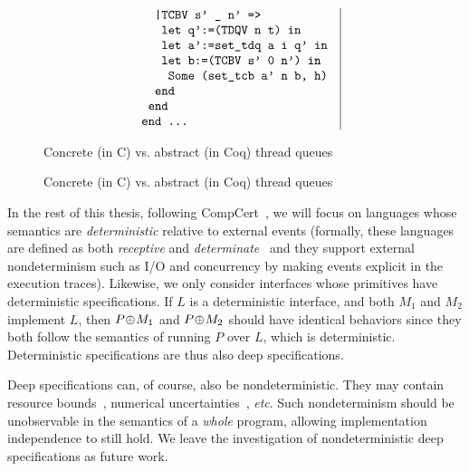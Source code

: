 \begin{figure}[t]
$$\begin{array}{l|l}
\begin{array}[t]{l}
\verb+  |TCBV s' _ n' =>+\\
\verb+   let q':=(TDQV n t) in+\\
\verb+   let a':=set_tdq a i q' in+\\
\verb+   let b:=(TCBV s' 0 n') in+\\
\verb+    Some (set_tcb a' n b, h)+\\
\verb+  end+\\
\verb+ end+\\
\verb+end ...+
\end{array}
\end{array}
$$ 
\caption{Concrete (in C) vs. abstract (in Coq) thread queues}
\label{fig:queue}
\end{figure}


\begin{figure}[tb]\centering
\subfloat[]{
\label{fig:queue:a}
    \begin{minipage}[t]{0.5\textwidth}
    \centering
 = C] {source_code/seq-dequeue.c}
    \end{minipage}
}
\subfloat[]
{\label{fig:queue:b}
    \begin{minipage}[t]{0.5\textwidth}
    \centering
 = C] {source_code/seq-dequeue.v}
  \end{minipage}
}\caption{Concrete (in C) vs. abstract (in Coq) thread queues}
\hrulefill
\label{fig:queue}
\end{figure}

In the rest of this thesis, following CompCert~\cite{Leroy-backend}, we
will focus on languages whose semantics are {\em
  deterministic} relative to external events (formally, these
languages are defined as both {\em receptive} and {\em
  determinate}~\cite{sevcik13} and they support external
nondeterminism such as I/O and concurrency by making events explicit 
in the execution traces).
Likewise, we only consider interfaces whose primitives
have deterministic specifications. If $L$ is a deterministic interface, 
and both $M_1$ and $M_2$ implement $L$, then $P\!\oplus\! M_1$ and $P\!\oplus\! M_2$
should have identical behaviors since they both follow the semantics
of running $P$ over $L$, which is deterministic. Deterministic 
specifications are thus also deep specifications.

Deep specifications can, of course, also be nondeterministic. They may
contain resource bounds~\cite{veristack}, numerical
uncertainties~\cite{chaudhuri10}, {\em etc}. Such nondeterminism should
be unobservable in the semantics of a {\em whole} program,
allowing implementation independence to still hold.  We leave the
investigation of nondeterministic deep specifications as future work.



